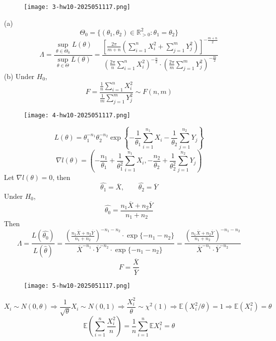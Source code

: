 \begin{exercise}
\begin{figure}[H]
\centering
\texttt{[image: 3-hw10-2025051117.png]}
\label{}
\end{figure}
\end{exercise}
(a)
\[
\Theta_0=\{ (\theta_1,\theta_2)\in \mathbb{R}_{>0}^2:\theta_1=\theta_2 \}
\]
\[
\Lambda=\frac{\sup_{\theta\in\Theta_0}L(\theta)}{\sup_{\theta\in\Theta}L(\theta)}=\frac{\left[ \frac{2\pi}{m+n}\left( \sum_{i=1}^{n} X_i^2+\sum_{j=1}^{m} Y_j^2 \right) \right]^{-\frac{m+n}{2}}}{\left( \frac{2\pi}{n} \sum_{i=1}^{n} X_i^2\right)^{-\frac{n}{2}}\cdot\left( \frac{2\pi}{m}\sum_{j=1}^{m} Y_j^2 \right)^{-\frac{m}{2}}}
\]
(b)
Under $H_0$,
\[
F=\frac{\frac{1}{n}\sum_{i=1}^{n} X_i^2}{\frac{1}{m}\sum_{j=1}^{m}Y_j^2 }\sim F(n,m)
\]
\begin{exercise}
\begin{figure}[H]
\centering
\texttt{[image: 4-hw10-2025051117.png]}
\label{}
\end{figure}
\end{exercise}
\[
L(\theta)=\theta_1^{-n_1}\theta_2^{-n_2}\exp \left\{  -\frac{1}{\theta_1}\sum_{i=1}^{n_1} X_i-\frac{1}{\theta_2}\sum_{j=1}^{n_2} Y_j  \right\}
\]
\[
\nabla l(\theta)=\left( -\frac{n_1}{\theta_1} +\frac{1}{\theta_1^2}\sum_{i=1}^{n_1} X_i,-\frac{n_2}{\theta_2}+\frac{1}{\theta_2^2}\sum_{j=1}^{n_2} Y_j\right)
\]
Let $\nabla l(\theta)=0$, then
\[
\widehat{\theta_1}=\overline{X},\qquad \widehat{\theta_2}=\overline{Y}
\]
Under $H_0$,
\[
\widehat{\theta_0}=\frac{n_1\overline{X}+n_2\overline{Y}}{n_1+n_2}
\]
Then
\[
\Lambda=\frac{L(\widehat{\theta_0})}{L(\widehat{\theta})}=\frac{(\frac{n_1\overline{X}+n_2\overline{Y}}{n_1+n_2})^{-n_1-n_2}\cdot \exp \{ -n_1-n_2 \}}{\overline{X}^{-n_1}\cdot \overline{Y}^{-n_2}\cdot \exp \{ -n_1-n_2 \}}=\frac{(\frac{n_1\overline{X}+n_2\overline{Y}}{n_1+n_2})^{-n_1-n_2}}{\overline{X}^{-n_1}\cdot \overline{Y}^{-n_2}}
\]
\[
F=\frac{\overline{X}}{\overline{Y}}
\]
\begin{exercise}
\begin{figure}[H]
\centering
\texttt{[image: 5-hw10-2025051117.png]}
\label{}
\end{figure}
\end{exercise}
\[
X_i\sim N(0,\theta)\Rightarrow \frac{1}{\sqrt{ \theta }}X_i\sim N(0,1)\Rightarrow\frac{X_i^2}{\theta}\sim \chi^{2}(1)\Rightarrow \mathbb{E}(X_i^2/\theta)=1\Rightarrow \mathbb{E}(X_i^2)=\theta
\]
\[
\mathbb{E}\left( \sum_{i=1}^{n} \frac{X_i^2}{n} \right)=\frac{1}{n}\sum_{i=1}^{n} \mathbb{E}X_i^2=\theta
\]
